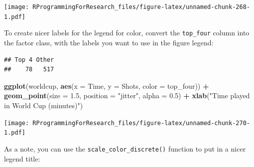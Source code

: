 \documentclass[]{book}
\makeatletter
\newenvironment{Shaded}{\begin{snugshade}}{\end{snugshade}}
\newcommand{\KeywordTok}[1]{\textcolor[rgb]{0.13,0.29,0.53}{\textbf{#1}}}
\newcommand{\DataTypeTok}[1]{\textcolor[rgb]{0.13,0.29,0.53}{#1}}
\newcommand{\FloatTok}[1]{\textcolor[rgb]{0.00,0.00,0.81}{#1}}
\newcommand{\StringTok}[1]{\textcolor[rgb]{0.31,0.60,0.02}{#1}}
\newcommand{\OtherTok}[1]{\textcolor[rgb]{0.56,0.35,0.01}{#1}}
\newcommand{\OperatorTok}[1]{\textcolor[rgb]{0.81,0.36,0.00}{\textbf{#1}}}
\newcommand{\NormalTok}[1]{#1}
\newenvironment{kframe}{%
\medskip{}
\setlength{\fboxsep}{.8em}
 \def\at@end@of@kframe{}%
 \ifinner\ifhmode%
  \def\at@end@of@kframe{\end{minipage}}%
  \begin{minipage}{\columnwidth}%
 \fi\fi%
 \def\FrameCommand##1{\hskip\@totalleftmargin \hskip-\fboxsep
 \colorbox{shadecolor}{##1}\hskip-\fboxsep
     \hskip-\linewidth \hskip-\@totalleftmargin \hskip\columnwidth}%
 \MakeFramed {\advance\hsize-\width
   \@totalleftmargin\z@ \linewidth\hsize
   \@setminipage}}%
 {\par\unskip\endMakeFramed%
 \at@end@of@kframe}
\renewenvironment{Shaded}{\begin{kframe}}{\end{kframe}}
\theoremstyle{definition}
\theoremstyle{definition}
\theoremstyle{definition}
\theoremstyle{remark}
\makeatother
\begin{document}
\texttt{[image: RProgrammingForResearch\_files/figure-latex/unnamed-chunk-268-1.pdf]}

To create nicer labels for the legend for color, convert the
\texttt{top\_four} column into the factor class, with the labels you
want to use in the figure legend:

\begin{Shaded}
\end{Shaded}

\begin{verbatim}
## Top 4 Other 
##    78   517
\end{verbatim}

\begin{Shaded}
\begin{Highlighting}[]
\KeywordTok{ggplot}\NormalTok{(worldcup, }\KeywordTok{aes}\NormalTok{(}\DataTypeTok{x =}\NormalTok{ Time, }\DataTypeTok{y =}\NormalTok{ Shots,}
                     \DataTypeTok{color =}\NormalTok{ top_four)) }\OperatorTok{+}
\StringTok{        }\KeywordTok{geom_point}\NormalTok{(}\DataTypeTok{size =} \FloatTok{1.5}\NormalTok{, }\DataTypeTok{position =} \StringTok{"jitter"}\NormalTok{,}
                   \DataTypeTok{alpha =} \FloatTok{0.5}\NormalTok{)  }\OperatorTok{+}\StringTok{ }
\StringTok{        }\KeywordTok{xlab}\NormalTok{(}\StringTok{"Time played in World Cup (minutes)"}\NormalTok{)}
\end{Highlighting}
\end{Shaded}

\texttt{[image: RProgrammingForResearch\_files/figure-latex/unnamed-chunk-270-1.pdf]}

As a note, you can use the \texttt{scale\_color\_discrete()} function to
put in a nicer legend title:
\end{document}

